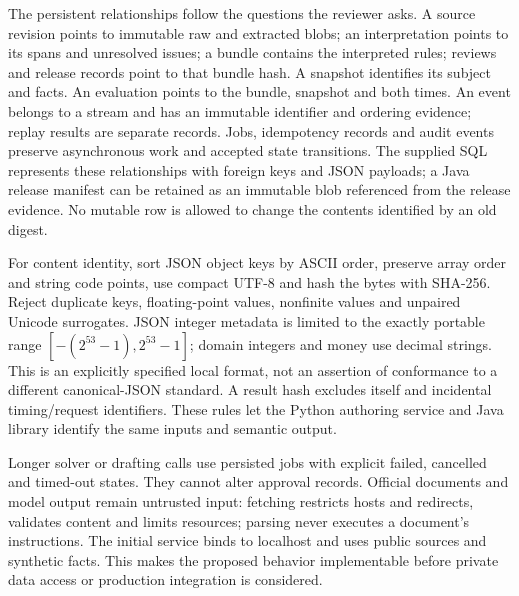 
The persistent relationships follow the questions the reviewer asks. A source
revision points to immutable raw and extracted blobs; an interpretation points
to its spans and unresolved issues; a bundle contains the interpreted rules;
reviews and release records point to that bundle hash. A snapshot identifies
its subject and facts. An evaluation points to the bundle, snapshot and both
times. An event belongs to a stream and has an immutable identifier and ordering
evidence; replay results are separate records. Jobs, idempotency records and audit
events preserve asynchronous work and accepted state transitions. The supplied
SQL represents these relationships with foreign keys and JSON payloads; a Java
release manifest can be retained as an immutable blob referenced from the
release evidence. No mutable row is allowed to change the contents identified
by an old digest.

For content identity, sort JSON object keys by ASCII order, preserve array order
and string code points, use compact UTF-8 and hash the bytes with SHA-256.
Reject duplicate keys, floating-point values, nonfinite values and unpaired
Unicode surrogates. JSON integer metadata is limited to the exactly portable
range $[-(2^{53}-1),2^{53}-1]$; domain integers and money use decimal strings.
This is an explicitly specified local format, not an assertion of conformance
to a different canonical-JSON standard. A result hash excludes itself and
incidental timing/request identifiers. These rules let the Python authoring
service and Java library identify the same inputs and semantic output.

Longer solver or drafting calls use persisted jobs with explicit failed,
cancelled and timed-out states. They cannot alter approval records. Official
documents and model output remain untrusted input: fetching restricts hosts and
redirects, validates content and limits resources; parsing never executes a
document's instructions. The initial service binds to localhost and uses public
sources and synthetic facts. This makes the proposed behavior implementable
before private data access or production integration is considered.





